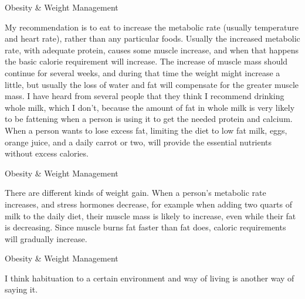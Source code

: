 \documentclass[11pt,oneside,openany,extrafontsizes]{memoir}
\begin{document}
\begin{standalonequote}{Obesity \& Weight Management}

    \begin{answer}
        My recommendation is to eat to increase the metabolic rate (usually temperature and heart rate), rather than any particular foods. Usually the increased metabolic rate, with adequate protein, causes some muscle increase, and when that happens the basic calorie requirement will increase. The increase of muscle mass should continue for several weeks, and during that time the weight might increase a little, but usually the loss of water and fat will compensate for the greater muscle mass. I have heard from several people that they think I recommend drinking whole milk, which I don't, because the amount of fat in whole milk is very likely to be fattening when a person is using it to get the needed protein and calcium. When a person wants to lose excess fat, limiting the diet to low fat milk, eggs, orange juice, and a daily carrot or two, will provide the essential nutrients without excess calories.
    \end{answer}
\end{standalonequote}

\begin{standalonequote}{Obesity \& Weight Management}

    \begin{answer}
        There are different kinds of weight gain. When a person's metabolic rate increases, and stress hormones decrease, for example when adding two quarts of milk to the daily diet, their muscle mass is likely to increase, even while their fat is decreasing. Since muscle burns fat faster than fat does, caloric requirements will gradually increase.
    \end{answer}
\end{standalonequote}

\begin{standalonequote}{Obesity \& Weight Management}

    \begin{answer}
        I think habituation to a certain environment and way of living is another way of saying it.
    \end{answer}
\end{standalonequote}
\end{document}
